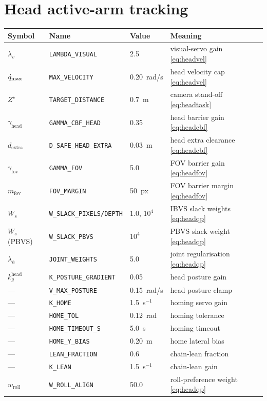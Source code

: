 \section{Head active-arm tracking}
\begin{tabularx}{\linewidth}{@{}l>{\scriptsize}ll>{\raggedright\arraybackslash}X@{}}
\toprule
Symbol & Name & Value & Meaning \\
\midrule
$\lambda_v$ & \texttt{LAMBDA\_VISUAL} & 2.5 & visual-servo gain \eqref{eq:headvel} \\
$\dot{q}_{\max}$ & \texttt{MAX\_VELOCITY} & 0.20~rad/s & head velocity cap \eqref{eq:headvel} \\
$Z^{\star}$ & \texttt{TARGET\_DISTANCE} & 0.7~m & camera stand-off \eqref{eq:headtask} \\
$\gamma_{\text{head}}$ & \texttt{GAMMA\_CBF\_HEAD} & 0.35 & head barrier gain \eqref{eq:headcbf} \\
$d_{\text{extra}}$ & \texttt{D\_SAFE\_HEAD\_EXTRA} & 0.03~m & head extra clearance \eqref{eq:headcbf} \\
$\gamma_{\text{fov}}$ & \texttt{GAMMA\_FOV} & 5.0 & FOV barrier gain \eqref{eq:headfov} \\
$m_{\text{fov}}$ & \texttt{FOV\_MARGIN} & 50~px & FOV barrier margin \eqref{eq:headfov} \\
$W_s$ & \texttt{W\_SLACK\_PIXELS/DEPTH} & $1.0$, $10^{4}$ & IBVS slack weights \eqref{eq:headqp} \\
$W_s$ (PBVS) & \texttt{W\_SLACK\_PBVS} & $10^{4}$ & PBVS slack weight \eqref{eq:headqp} \\
$\lambda_h$ & \texttt{JOINT\_WEIGHTS} & 5.0 & joint regularisation \eqref{eq:headqp} \\
$k_g^{\text{head}}$ & \texttt{K\_POSTURE\_GRADIENT} & 0.05 & head posture gain \\
--- & \texttt{V\_MAX\_POSTURE} & 0.15~rad/s & head posture clamp \\
--- & \texttt{K\_HOME} & 1.5~s$^{-1}$ & homing servo gain \\
--- & \texttt{HOME\_TOL} & 0.12~rad & homing tolerance \\
--- & \texttt{HOME\_TIMEOUT\_S} & 5.0~s & homing timeout \\
--- & \texttt{HOME\_Y\_BIAS} & 0.20~m & home lateral bias \\
--- & \texttt{LEAN\_FRACTION} & 0.6 & chain-lean fraction \\
--- & \texttt{K\_LEAN} & 1.5~s$^{-1}$ & chain-lean gain \\
$w_{\text{roll}}$ & \texttt{W\_ROLL\_ALIGN} & 50.0 & roll-preference weight \eqref{eq:headqp} \\

\end{tabularx}
